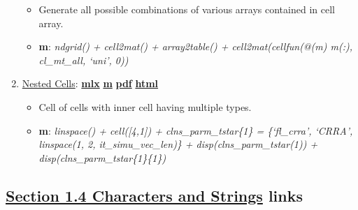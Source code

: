 \documentclass[
]{book}
\providecommand{\tightlist}{%
  \setlength{\itemsep}{0pt}\setlength{\parskip}{0pt}}
\begin{document}
\begin{enumerate}
  \begin{itemize}
  \tightlist
  \item
    Generate all possible combinations of various arrays contained in cell array.
  \item
    \textbf{m}: \emph{ndgrid() + cell2mat() + array2table() + cell2mat(cellfun(@(m) m(:), cl\_mt\_all, `uni', 0))}
  \end{itemize}
\item
  \href{https://fanwangecon.github.io/M4Econ/amto/cell/htmlpdfm/fs_cellsnested.html}{Nested Cells}: \href{https://github.com/FanWangEcon/M4Econ/blob/master/amto/cell/fs_cellsnested.mlx}{\textbf{mlx}} \textbar{} \href{https://github.com/FanWangEcon/M4Econ/blob/master/amto/cell/htmlpdfm/fs_cellsnested.m}{\textbf{m}} \textbar{} \href{https://github.com/FanWangEcon/M4Econ/blob/master/amto/cell/htmlpdfm/fs_cellsnested.pdf}{\textbf{pdf}} \textbar{} \href{https://fanwangecon.github.io/M4Econ/amto/cell/htmlpdfm/fs_cellsnested.html}{\textbf{html}}

  \begin{itemize}
  \tightlist
  \item
    Cell of cells with inner cell having multiple types.
  \item
    \textbf{m}: \emph{linspace() + cell({[}4,1{]}) + clns\_parm\_tstar\{1\} = \{`fl\_crra', `CRRA', linspace(1, 2, it\_simu\_vec\_len)\} + disp(clns\_parm\_tstar(1)) + disp(clns\_parm\_tstar\{1\}\{1\})}
  \end{itemize}
\end{enumerate}

\hypertarget{section-1.4-characters-and-stringscharacters-and-strings-links}{%
\subsection{\texorpdfstring{\protect\hyperlink{characters-and-strings}{Section 1.4 Characters and Strings} links}{Section 1.4 Characters and Strings links}}\label{section-1.4-characters-and-stringscharacters-and-strings-links}}
\end{document}
